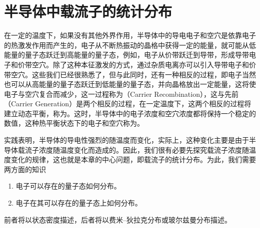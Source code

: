 \chapter{半导体中载流子的统计分布}
在一定的温度下，如果没有其他外界作用，半导体中的导电电子和空穴是依靠电子的热激发作用而产生的，电子从不断热振动的晶格中获得一定的能量，就可能从低能量的量子态跃迁到高能量的量子态，例如，电子从价带跃迁到导带，形成导带电子和价带空穴。除了这种本征激发的方式，通过杂质电离亦可以引入导带电子和价带空穴。这些我们已经很熟悉了，但与此同时，还有一种相反的过程，即电子当然也可以从高能量的量子态跃迁到低能量的量子态，并向晶格放出一定能量，这将使电子与空穴复合而减少，这一过程称为（Carrier Recombination），这与先前（Carrier Generation）是两个相反的过程，在一定温度下，这两个相反的过程将建立动态平衡，称为。这时，半导体中的电子浓度和空穴浓度都将保持一个稳定的数值，这种热平衡状态下的电子和空穴称为。

实践表明，半导体的导电性强烈的随温度而变化，实际上，这种变化主要是由于半导体载流子浓度随温度变化而造成的。因此，我们很有必要先探究载流子浓度随温度变化的规律，这也就是本章的中心问题，即载流子的统计分布。为此，我们需要两方面的知识
\begin{enumerate}
    \item 电子可以存在的量子态如何分布。
    \item 电子在其可以存在的量子态上如何分布。
\end{enumerate}
前者将以状态密度描述，后者将以费米--狄拉克分布或玻尔兹曼分布描述。


